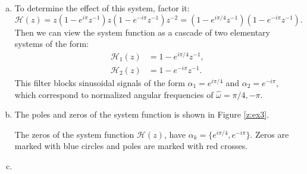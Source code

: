 \begin{enumerate}
\begin{enumerate}[a)]
\item To determine the effect of this system, factor it:
$$\mathcal{H}(z)=z(1-e^{i\pi}z^{-1})z(1-e^{-i\pi}z^{-1})z^{-2}=(1-e^{i\pi/4}z^{-1})(1-e^{-i\pi}z^{-1}).$$
Then we can view the system function as a cascade of two elementary systems of the form:
\begin{align*}
    \mathcal{H}_{1}(z)&=1-e^{i\pi/4}z^{-1},\\
    \mathcal{H}_{2}(z)&=1-e^{-i\pi}z^{-1}.
\end{align*}
This filter blocks sinusoidal signals of the form $\alpha_{1}=e^{i\pi/4}$ and $\alpha_{2}=e^{-i\pi}$, which correspond to normalized angular frequencies of $\hat{\omega}=\pi/4,-\pi$. 

\item The poles and zeros of the system function is shown in Figure \ref{z:ex3}. 

\begin{marginfigure}[-5cm]
\begin{center}
\end{center}
\caption{The zeros of the system function $\mathcal{H}(z)$,
have $\alpha_k=\{e^{i\pi/4},e^{-i\pi}\}$. Zeros are marked with blue
    circles and poles are marked with red crosses.}
\label{z:ex3}
\end{marginfigure}

\item 


\end{enumerate}


\end{enumerate}